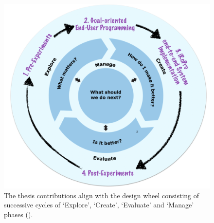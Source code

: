 \begin{figure}[h]
	\centering
	\includegraphics[width=0.8\linewidth]{figures/designwheel}
	\caption{The thesis contributions align with the design wheel consisting of successive cycles of `Explore', `Create', `Evaluate' and `Manage' phases  (\cite{designwheel}).}
	\label{fig:designwheel}
\end{figure}
